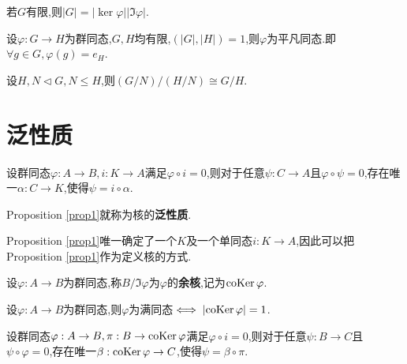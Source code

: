 \begin{cor}
    若$G$有限,则$\lvert G \rvert = \lvert \ker \varphi \rvert \lvert \Im \varphi \rvert$.
\end{cor}

\begin{cor}
    设$\varphi: G \to H$为群同态,$G, H$均有限,$(\lvert G \rvert, \lvert H \rvert) = 1$,则$\varphi$为平凡同态.即$\forall g \in G, \varphi(g) = e_H$.
\end{cor}

\begin{thm}
    设$H, N \lhd G, N \leqslant H$,则$(G / N) / (H / N) \cong G / H$.
\end{thm}

\section{泛性质}

\begin{prop}\label{prop1}
    设群同态$\varphi: A \to B, i: K \to A$满足$\varphi \circ i = 0$,则对于任意$\psi: C \to A$且$\varphi \circ \psi = 0$,存在唯一$\alpha: C \to K$,使得$\psi = i \circ \alpha$.
\end{prop}

\begin{rqq}
    Proposition \ref{prop1}就称为核的\textbf{泛性质}.
\end{rqq}

\begin{rqq}
    Proposition \ref{prop1}唯一确定了一个$K$及一个单同态$i: K \to A$,因此可以把Proposition \ref{prop1}作为定义核的方式.
\end{rqq}

\begin{deff}
    设$\varphi: A \to B$为群同态,称$B / \Im \varphi$为$\varphi$的\textbf{余核},记为$\operatorname{coKer}\varphi$.
\end{deff}

\begin{prop}
    设$\varphi: A \to B$为群同态,则$\varphi$为满同态$\iff \lvert \operatorname{coKer} \varphi \rvert = 1$.
\end{prop}

\begin{prop}
    设群同态$\varphi: A \to B, \pi: B \to \operatorname{coKer} \varphi$满足$\varphi \circ i = 0$,则对于任意$\psi: B \to C$且$\psi \circ \varphi = 0$,存在唯一$\beta: \operatorname{coKer} \varphi \to C$,使得$\psi = \beta \circ \pi$.
\end{prop}